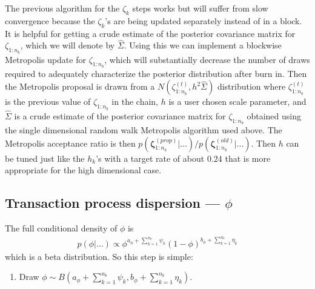 \documentclass{article}
\begin{document}
The previous algorithm for the $\zeta_k$ steps works but will suffer from slow convergence because the $\zeta_k$'s are being updated separately instead of in a block. It is helpful for getting a crude estimate of the posterior covariance matrix for $\zeta_{1:n_b}$, which we will denote by $\hat{\Sigma}$. Using this we can implement a blockwise Metropolis update for $\zeta_{1:n_b}$, which will substantially decrease the number of draws required to adequately characterize the posterior distribution after burn in. Then the Metropolis proposal is drawn from a $N(\zeta_{1:n_b}^{(t)}, h^2\hat{\Sigma})$ distribution where $\zeta_{1:n_b}^{(t)}$ is the previous value of $\zeta_{1:n_b}$ in the chain, $h$ is a user chosen scale parameter, and $\hat{\Sigma}$ is a crude estimate of the posterior covariance matrix for $\zeta_{1:n_b}$ obtained using the single dimensional random walk Metropolis algorithm used above. The Metropolis acceptance ratio is then $p(\bm{\zeta}_{1:n_b}^{(prop)}|...)/p(\bm{\zeta}_{1:n_b}^{(old)}|...)$. Then $h$ can be tuned just like the $h_k$'s with a target rate of about $0.24$ that is more appropriate for the high dimensional case.

\subsection{Transaction process dispersion --- $\phi$}
The full conditional density of $\phi$ is
\begin{align*}
p(\phi|...) \propto \phi^{a_\phi + \sum_{k=1}^{n_b}\psi_k}(1-\phi)^{b_\phi + \sum_{k=1}^{n_b}\eta_k}
\end{align*}
which is a beta distribution. So this step is simple:
\begin{enumerate}
\item Draw $\phi \sim B\left(a_\phi + \sum_{k=1}^{n_{b}}\psi_k, b_{\phi} + \sum_{k=1}^{n_{b}}\eta_k \right)$.
\end{enumerate}
\end{document}
